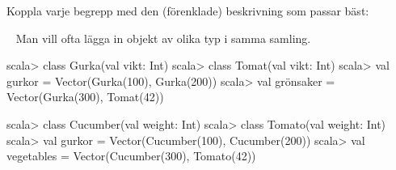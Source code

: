 

\ifPreSolution

\Exercise{\ExeWeekTEN}\label{exe:W10}

\begin{Goals}

\end{Goals}

\begin{Preparations}
\item {}
\end{Preparations}

\BasicTasks

\else

\ExerciseSolution{\ExeWeekTEN}

\BasicTasks

\fi




\QUESTBEGIN

\Task \what

\vspace{1em}\noindent Koppla varje begrepp med den (förenklade) beskrivning som passar bäst:

\begin{ConceptConnections}

\end{ConceptConnections}

\SOLUTION

\TaskSolved \what

\begin{ConceptConnections}

\end{ConceptConnections}

\QUESTEND






\QUESTBEGIN

\Task  \what~  Man vill ofta lägga in objekt av olika typ i samma samling.
\ifswedish
\begin{REPL}
scala> class Gurka(val vikt: Int)
scala> class Tomat(val vikt: Int)
scala> val gurkor = Vector(Gurka(100), Gurka(200))
scala> val grönsaker = Vector(Gurka(300), Tomat(42))
\end{REPL}
\else
\begin{REPL}
scala> class Cucumber(val weight: Int)
scala> class Tomato(val weight: Int)
scala> val gurkor = Vector(Cucumber(100), Cucumber(200))
scala> val vegetables = Vector(Cucumber(300), Tomato(42))
\end{REPL}
\fi

